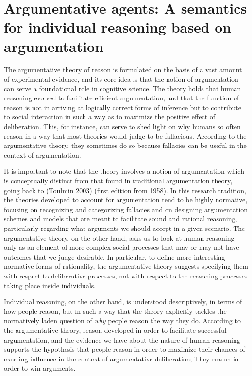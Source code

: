 \documentclass[greybox]{svmult}
\begin{document}
\section{Argumentative agents: A semantics for individual reasoning based on argumentation}\label{sec:arg}

The argumentative theory of reason is formulated on the basis of a vast amount of experimental evidence, and its core idea is that the notion of argumentation can serve a foundational role in cognitive science. The theory holds that human reasoning evolved to facilitate efficient argumentation, and that the function of reason is not in arriving at logically correct forms of inference but to contribute to social interaction in such a way as to maximize the positive effect of  deliberation. This, for instance, can serve to shed light on why humans so often reason in a way that most theories would judge to be fallacious. According to the argumentative theory, they sometimes do so because fallacies can be useful in the context of argumentation.

It is important to note that the theory involves a notion of argumentation which is conceptually distinct from that found in traditional argumentation theory, going back to (Toulmin 2003) (first edition from 1958). In this research tradition, the theories developed to account for argumentation tend to be highly normative, focusing on recognizing and categorizing fallacies and on designing argumentation schemes and models that are meant to facilitate sound and rational reasoning, particularly regarding what arguments we should accept in a given scenario. The argumentative theory, on the other hand, asks us to look at human reasoning only as an element of more complex social processes that may or may not have outcomes that we judge desirable. In particular, to define more interesting normative forms of rationality, the argumentative theory suggests specifying them with respect to deliberative processes, not with respect to the reasoning processes taking place inside individuals.

Individual reasoning, on the other hand, is understood descriptively, in terms of how people reason, but in such a way that the theory explicitly tackles the normatively laden question of \emph{why} people reason the way they do. According to the argumentative theory, reason developed in order to facilitate successful argumentation, and the evidence we have about the nature of human reasoning supports the hypothesis that people reason in order to maximize their chances of exerting influence in the context of argumentative deliberation; They reason in order to win arguments.
\end{document}
